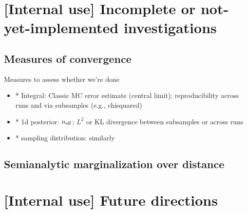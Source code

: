 \documentclass[twocolumn,prd,nofootinbib]{revtex4}
\newcommand\ForInternalReference[1]{#1}
\begin{document}
\ForInternalReference{
\section{[Internal use] Incomplete or not-yet-implemented investigations}

\subsection{Measures of convergence}

Measures to assess whether we're done
\begin{itemize}
\item * Integral: Classic MC error estimate (central limit); reproducibility across runs and via subsamples (e.g., chisquared)

\item * 1d posterior:  $n_{\rm eff}$; $L^2$ or KL divergence between subsamples or across runs

\item * sampling distribution: similarly
\end{itemize}


\subsection{Semianalytic marginalization over distance}


\section{[Internal use] Future directions}


}

\end{document}
